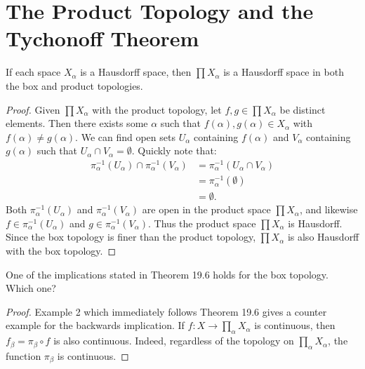 \documentclass[10pt,twoside,openany]{memoir}
\begin{document}
\chapter{The Product Topology and the Tychonoff Theorem}
\begin{problem}[manual-num={19.3}]
If each space $X_\alpha$ is a Hausdorff space, then $\prod X_\alpha$ is a Hausdorff space in both the box and product topologies.
\end{problem}
\begin{proof}
    Given $\prod X_\alpha$ with the product topology, let $f,g \in \prod X_\alpha$ be distinct elements. Then there exists some $\alpha$ such that $f(\alpha),g(\alpha) \in X_\alpha$ with $f(\alpha) \neq g(\alpha)$. We can find open sets $U_\alpha$ containing $f(\alpha)$ and $V_\alpha$ containing $g(\alpha)$ such that $U_\alpha \cap V_\alpha = \emptyset$. Quickly note that:
        \begin{equation*}
        \begin{split}
            \pi_\alpha^{-1}(U_\alpha) \cap \pi_\alpha^{-1}(V_\alpha)
            & = \pi_\alpha^{-1} (U_\alpha \cap V_\alpha) \\
            & = \pi_\alpha^{-1}(\emptyset) \\
            & = \emptyset.
        \end{split}
        \end{equation*}
    Both $\pi_\alpha^{-1}(U_\alpha)$ and $\pi_\alpha^{-1}(V_\alpha)$ are open in the product space $\prod X_\alpha$, and likewise $f \in \pi_\alpha^{-1}(U_\alpha)$ and $g \in \pi_\alpha^{-1}(V_\alpha)$. Thus the product space $\prod X_\alpha$ is Hausdorff. Since the box topology is finer than the product topology, $\prod X_\alpha$ is also Hausdorff with the box topology.
\end{proof}

\begin{problem}[manual-num={19.5}]
One of the implications stated in Theorem 19.6 holds for the box topology. Which one?
\end{problem}
\begin{proof}
    Example 2 which immediately follows Theorem 19.6 gives a counter example for the backwards implication. If $f:X \rightarrow \prod_{\alpha}X_\alpha$ is continuous, then $f_\beta  = \pi_\beta \circ f$ is also continuous. Indeed, regardless of the topology on $\prod_\alpha X_\alpha$, the function $\pi_\beta$ is continuous.
\end{proof}
\end{document}
